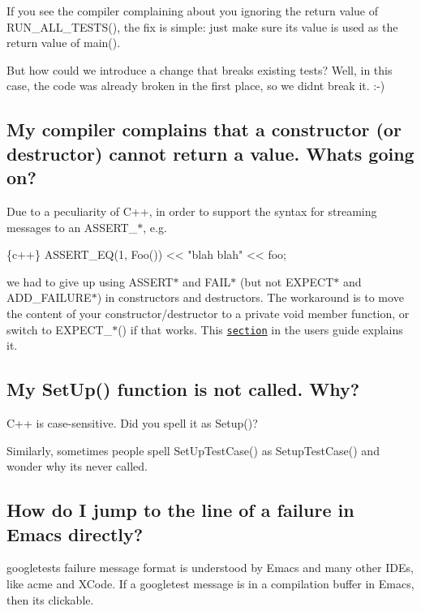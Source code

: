 If you see the compiler complaining about you ignoring the return value of {\ttfamily R\+U\+N\+\_\+\+A\+L\+L\+\_\+\+T\+E\+S\+T\+S()}, the fix is simple\+: just make sure its value is used as the return value of {\ttfamily main()}.

But how could we introduce a change that breaks existing tests? Well, in this case, the code was already broken in the first place, so we didn\textquotesingle{}t break it. \+:-\/)

\subsection*{My compiler complains that a constructor (or destructor) cannot return a value. What\textquotesingle{}s going on?}

Due to a peculiarity of C++, in order to support the syntax for streaming messages to an {\ttfamily A\+S\+S\+E\+R\+T\+\_\+$\ast$}, e.\+g.


\begin{DoxyCode}
\{c++\}
  ASSERT\_EQ(1, Foo()) << "blah blah" << foo;
\end{DoxyCode}


we had to give up using {\ttfamily A\+S\+S\+E\+R\+T$\ast$} and {\ttfamily F\+A\+I\+L$\ast$} (but not {\ttfamily E\+X\+P\+E\+C\+T$\ast$} and {\ttfamily A\+D\+D\+\_\+\+F\+A\+I\+L\+U\+R\+E$\ast$}) in constructors and destructors. The workaround is to move the content of your constructor/destructor to a private void member function, or switch to {\ttfamily E\+X\+P\+E\+C\+T\+\_\+$\ast$()} if that works. This \href{advanced.md#assertion-placement}{\tt section} in the user\textquotesingle{}s guide explains it.

\subsection*{My Set\+Up() function is not called. Why?}

C++ is case-\/sensitive. Did you spell it as {\ttfamily Setup()}?

Similarly, sometimes people spell {\ttfamily Set\+Up\+Test\+Case()} as {\ttfamily Setup\+Test\+Case()} and wonder why it\textquotesingle{}s never called.

\subsection*{How do I jump to the line of a failure in Emacs directly?}

googletest\textquotesingle{}s failure message format is understood by Emacs and many other I\+D\+Es, like acme and X\+Code. If a googletest message is in a compilation buffer in Emacs, then it\textquotesingle{}s clickable.

